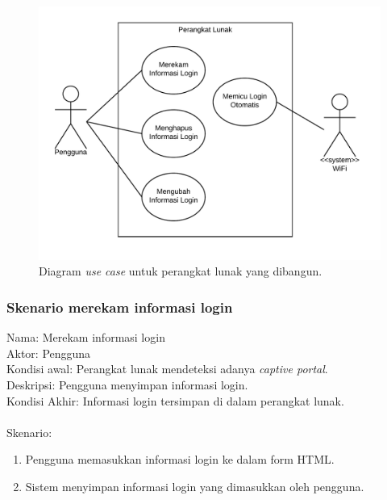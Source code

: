 \begin{figure}[h]
    \centering
    \includegraphics[scale=0.77]{Gambar/usecase.png}
    \caption[Diagram \textit{use case} untuk perangkat lunak yang dibangun.]{Diagram \textit{use case} untuk perangkat lunak yang dibangun.}
    \label{fig:usecase}
\end{figure}

\subsubsection{Skenario merekam informasi login}
Nama: Merekam informasi login\\
Aktor: Pengguna\\
Kondisi awal: Perangkat lunak mendeteksi adanya \textit{captive portal}.\\
Deskripsi: Pengguna menyimpan informasi login.\\
Kondisi Akhir: Informasi login tersimpan di dalam perangkat lunak.\\\\
Skenario:
\begin{enumerate}
    \item{Pengguna memasukkan informasi login ke dalam form HTML.}
    \item{Sistem menyimpan informasi login yang dimasukkan oleh pengguna.}
\end{enumerate}

